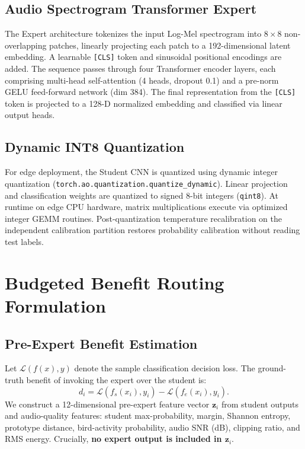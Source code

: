 \documentclass[11pt,a4paper]{article}
\begin{document}
\subsection{Audio Spectrogram Transformer Expert}
The Expert architecture tokenizes the input Log-Mel spectrogram into $8 \times 8$ non-overlapping patches, linearly projecting each patch to a 192-dimensional latent embedding. A learnable \texttt{[CLS]} token and sinusoidal positional encodings are added. The sequence passes through four Transformer encoder layers, each comprising multi-head self-attention (4 heads, dropout 0.1) and a pre-norm GELU feed-forward network (dim 384). The final representation from the \texttt{[CLS]} token is projected to a 128-D normalized embedding and classified via linear output heads.

\subsection{Dynamic INT8 Quantization}
For edge deployment, the Student CNN is quantized using dynamic integer quantization (\texttt{torch.ao.quantization.quantize\_dynamic}). Linear projection and classification weights are quantized to signed 8-bit integers (\texttt{qint8}). At runtime on edge CPU hardware, matrix multiplications execute via optimized integer GEMM routines. Post-quantization temperature recalibration on the independent calibration partition restores probability calibration without reading test labels.

\section{Budgeted Benefit Routing Formulation}
\subsection{Pre-Expert Benefit Estimation}
Let $\mathcal{L}(f(x), y)$ denote the sample classification decision loss. The ground-truth benefit of invoking the expert over the student is:
\begin{equation}
d_i = \mathcal{L}(f_s(x_i), y_i) - \mathcal{L}(f_e(x_i), y_i).
\end{equation}
We construct a 12-dimensional pre-expert feature vector $\mathbf{z}_i$ from student outputs and audio-quality features: student max-probability, margin, Shannon entropy, prototype distance, bird-activity probability, audio SNR (dB), clipping ratio, and RMS energy. Crucially, \textbf{no expert output is included in $\mathbf{z}_i$}.
\end{document}
